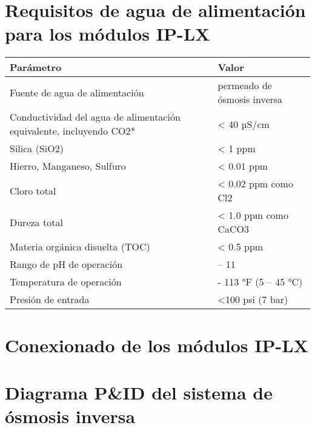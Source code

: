 
\begin{appendixs}
    \fontsize{10}{12}\selectfont
    \section{Requisitos de agua de alimentación para los módulos IP-LX}
    \renewcommand{\arraystretch}{1} %
    \begin{longtable}{|>{\raggedright\arraybackslash}m{8cm} |>{\raggedright\arraybackslash}m{8cm}|}
        \toprule
        \textbf{Parámetro}                                                  & \textbf{Valor}              \\
        \midrule
        Fuente de agua de alimentación                                      & permeado de ósmosis inversa \\
        \hline
        Conductividad del agua de alimentación equivalente, incluyendo CO2* & < 40 µS/cm                  \\
        \hline
        Silica (SiO2)                                                       & < 1 ppm                     \\
        \hline
        Hierro, Manganeso, Sulfuro                                          & < 0.01 ppm                  \\
        \hline
        Cloro total                                                         & < 0.02 ppm como Cl2         \\
        \hline
        Dureza total                                                        & < 1.0 ppm como CaCO3        \\
        \hline
        Materia orgánica disuelta (TOC)                                     & < 0.5 ppm                   \\
        \hline
        Rango de pH de operación                                            & 4 – 11                      \\
        \hline
        Temperatura de operación                                            & 41 - 113 °F (5 – 45 °C)     \\
        \hline
        Presión de entrada                                                  & <100 psi (7 bar)            \\
        \bottomrule
    \end{longtable}
    \section{Conexionado de los módulos IP-LX}
    \section{Diagrama P\&ID del sistema de ósmosis inversa}

\end{appendixs}